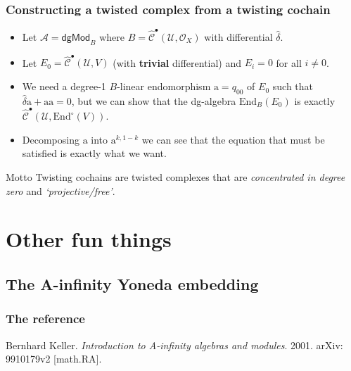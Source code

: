 \documentclass{beamer}
\begin{document}
        \begin{frame}\frametitle{Constructing a twisted complex from a twisting cochain}
            \begin{itemize}
                \item Let $\mathcal{A}=\mathsf{dgMod}_B$ where $B=\hat{\mathscr{C}}^\bullet(\mathcal{U},\mathcal{O}_X)$ with differential $\hat{\delta}$.
                \pause
                \item Let $E_0=\hat{\mathscr{C}}^\bullet(\mathcal{U},V)$ (with \textbf{trivial} differential) and $E_i=0$ for all $i\neq0$.
                \pause
                \item We need a degree-1 $B$-linear endomorphism $\mathrm{a}=q_{00}$ of $E_0$ such that $\hat{\delta}\mathrm{a}+\mathrm{a}\mathrm{a}=0$, but we can show that the dg-algebra $\mathrm{End}_B(E_0)$ is exactly $\hat{\mathscr{C}}^\bullet(\mathcal{U},\mathrm{End}^\circ(V))$.
                \pause
                \item Decomposing $\mathrm{a}$ into $\mathrm{a}^{k,1-k}$ we can see that the equation that must be satisfied is exactly what we want.
            \end{itemize}

            \pause

            \begin{block}{Motto}
                Twisting cochains are twisted complexes that are \emph{concentrated in degree zero} and \emph{`projective/free'}.
            \end{block}
        \end{frame}


\section{Other fun things}

    \subsection{The A-infinity Yoneda embedding}

        \begin{frame}\frametitle{The reference}
            Bernhard Keller. \emph{Introduction to A-infinity algebras and modules}. 2001. arXiv: 9910179v2 [math.RA].
        \end{frame}
\end{document}
